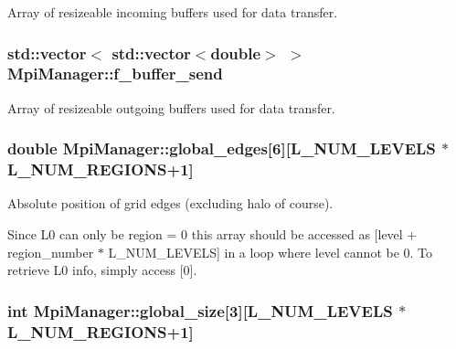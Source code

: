 Array of resizeable incoming buffers used for data transfer. 

\subsubsection[{\texorpdfstring{f\+\_\+buffer\+\_\+send}{f_buffer_send}}]{\setlength{\rightskip}{0pt plus 5cm}std\+::vector$<$ std\+::vector$<$double$>$ $>$ Mpi\+Manager\+::f\+\_\+buffer\+\_\+send}\hypertarget{class_mpi_manager_aafbb74832f69a915927b9bf252bd971d}{}\label{class_mpi_manager_aafbb74832f69a915927b9bf252bd971d}


Array of resizeable outgoing buffers used for data transfer. 

\subsubsection[{\texorpdfstring{global\+\_\+edges}{global_edges}}]{\setlength{\rightskip}{0pt plus 5cm}double Mpi\+Manager\+::global\+\_\+edges\mbox{[}6\mbox{]}\mbox{[}{\bf L\+\_\+\+N\+U\+M\+\_\+\+L\+E\+V\+E\+LS} $\ast${\bf L\+\_\+\+N\+U\+M\+\_\+\+R\+E\+G\+I\+O\+NS}+1\mbox{]}}\hypertarget{class_mpi_manager_a26f0512e19009451431d6d0ba59bf81a}{}\label{class_mpi_manager_a26f0512e19009451431d6d0ba59bf81a}


Absolute position of grid edges (excluding halo of course). 

Since L0 can only be region = 0 this array should be accessed as \mbox{[}level + region\+\_\+number $\ast$ L\+\_\+\+N\+U\+M\+\_\+\+L\+E\+V\+E\+LS\mbox{]} in a loop where level cannot be 0. To retrieve L0 info, simply access \mbox{[}0\mbox{]}. 
\subsubsection[{\texorpdfstring{global\+\_\+size}{global_size}}]{\setlength{\rightskip}{0pt plus 5cm}int Mpi\+Manager\+::global\+\_\+size\mbox{[}3\mbox{]}\mbox{[}{\bf L\+\_\+\+N\+U\+M\+\_\+\+L\+E\+V\+E\+LS} $\ast${\bf L\+\_\+\+N\+U\+M\+\_\+\+R\+E\+G\+I\+O\+NS}+1\mbox{]}}\hypertarget{class_mpi_manager_a3cdf6e1ce19f22daa9e84bc88bf4382d}{}\label{class_mpi_manager_a3cdf6e1ce19f22daa9e84bc88bf4382d}


